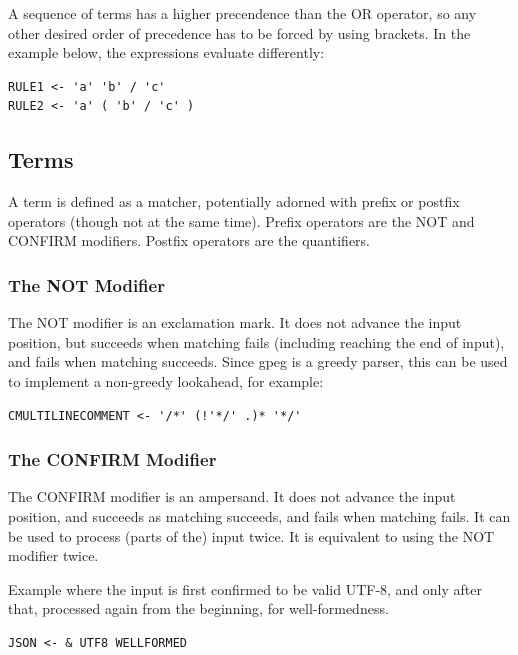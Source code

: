 A sequence of terms has a higher precendence than the OR operator,
so any other desired order of precedence has to be forced by using
brackets.
In the example below, the expressions evaluate differently:

\begin{myquote}
\begin{verbatim}
RULE1 <- 'a' 'b' / 'c'
RULE2 <- 'a' ( 'b' / 'c' )
\end{verbatim}
\end{myquote}

\subsection{Terms}

A term is defined as a matcher, potentially adorned with prefix
or postfix operators (though not at the same time).
Prefix operators are the NOT and CONFIRM modifiers.
Postfix operators are the quantifiers.

\subsubsection{The NOT Modifier}

The NOT modifier is an exclamation mark.
It does not advance the input position, but succeeds
when matching fails (including reaching the end of input),
and fails when matching succeeds.
Since gpeg is a greedy parser,
this can be used to implement a non-greedy lookahead, for example:
 
\begin{myquote}
\begin{verbatim}
CMULTILINECOMMENT <- '/*' (!'*/' .)* '*/'
\end{verbatim}
\end{myquote}

\subsubsection{The CONFIRM Modifier}

The CONFIRM modifier is an ampersand.
It does not advance the input position, and succeeds
as matching succeeds, and fails when matching fails.
It can be used to process (parts of the) input twice.
It is equivalent to using the NOT modifier twice.

Example where the input is first confirmed to be valid UTF-8,
and only after that, processed again from the beginning, for
well-formedness.
\begin{myquote}
\begin{verbatim}
JSON <- & UTF8 WELLFORMED
\end{verbatim}
\end{myquote}

